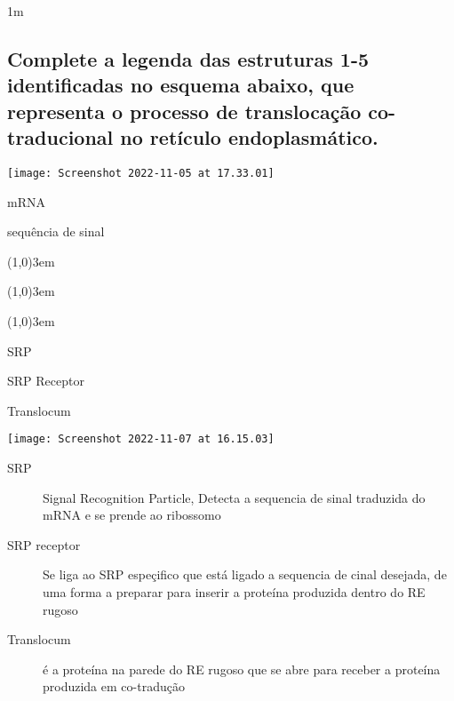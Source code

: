 \documentclass[\mainfilename]{subfiles}
\begin{document}
\begin{questionBox}1m{} %
    
    \subsection*{Complete a legenda das estruturas 1-5 identificadas no esquema abaixo, que representa o processo de translocação co-traducional no retículo endoplasmático.}

    \begin{center}
        \texttt{[image: Screenshot 2022-11-05 at 17.33.01]}
    \end{center}

    \begin{enumerate}
        \begin{multicols}{2}
            \item mRNA
            \item sequência de sinal
        \end{multicols}
        \begin{multicols}{3}
            \item \line(1,0){3em}
            \item \line(1,0){3em}
            \item \line(1,0){3em}
        \end{multicols}
    \end{enumerate}

    \begin{answerBox}{} %
        \begin{enumerate}
            \begin{multicols}{3}
                \setcounter{enumi}{2}
                \item SRP
                \item SRP Receptor
                \item Translocum
            \end{multicols}
        \end{enumerate}

        \begin{center}
            \texttt{[image: Screenshot 2022-11-07 at 16.15.03]}
        \end{center}

        \begin{description}
           \item[SRP] Signal Recognition Particle, Detecta a sequencia de sinal traduzida do mRNA e se prende ao ribossomo
           \item[SRP receptor] Se liga ao SRP espeçifico que está ligado a sequencia de cinal desejada, de uma forma a preparar para inserir a proteína produzida dentro do RE rugoso
           \item[Translocum] é a proteína na parede do RE rugoso que se abre para receber a proteína produzida em co-tradução
        \end{description}
    \end{answerBox}

\end{questionBox}
\end{document}
